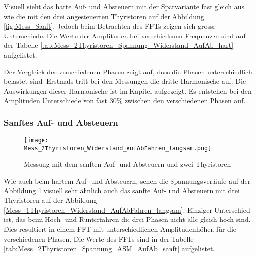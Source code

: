 Visuell sieht das harte Auf- und Absteuern mit der Sparvariante fast gleich aus wie die mit den drei angesteuerten Thyristoren auf der Abbildung \ref{fig:Mess_Sanft}. Jedoch beim Betrachten des FFTs zeigen sich grosse Unterschiede. Die Werte der Amplituden bei verschiedenen Frequenzen sind auf der Tabelle \ref{tab:Mess_2Thyristoren_Spannung_Widerstand_AufAb_hart} aufgelistet.

Der Vergleich der verschiedenen Phasen zeigt auf, dass die Phasen unterschiedlich belastet sind. Erstmals tritt bei den Messungen die dritte Harmonische auf. Die Auswirkungen dieser Harmonische ist im Kapitel  aufgezeigt. Es entstehen bei den Amplituden Unterschiede von fast 30\% zwischen den verschiedenen Phasen auf. 
\newpage
\subsubsection*{Sanftes Auf- und Absteuern}

\begin{figure}[ht!]
	\centering
	\texttt{[image: Mess\_2Thyristoren\_Widerstand\_AufAbFahren\_langsam.png]}	
	\caption{Messung mit dem sanften Auf- und Absteuern und zwei Thyristoren}\label{fig:Mess_2Thyristoren_Widerstand_AufAbFahren_langsam}	
\end{figure}

Wie auch beim hartem Auf- und Absteuern, sehen die Spannungsverläufe auf der Abbildung \ref{fig:Mess_2Thyristoren_Widerstand_AufAbFahren_langsam} visuell sehr ähnlich auch das sanfte Auf- und Absteuern mit drei Thyristoren auf der Abbildung \ref{Mess_1Thyristoren_Widerstand_AufAbFahren_langsam}. Einziger Unterschied ist, das beim Hoch- und Runterfahren die drei Phasen nicht alle gleich hoch sind. Dies resultiert in einem FFT mit unterschiedlichen Amplitudenhöhen für die verschiedenen Phasen. Die Werte des FFTs sind in der Tabelle \ref{tab:Mess_2Thyristoren_Spannung_ASM_AufAb_sanft} aufgelistet. 

